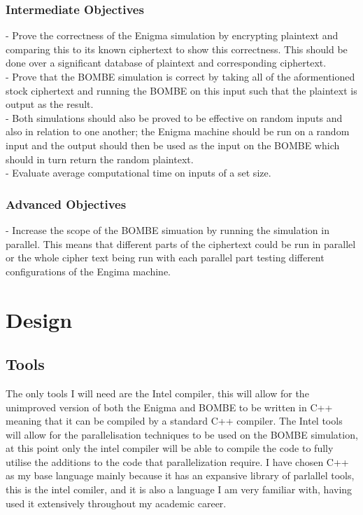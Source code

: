 \documentclass[12pt,a4paper]{article}
\begin{document}
\subsubsection{Intermediate Objectives}

- Prove the correctness of the Enigma simulation by encrypting plaintext and comparing this to its known ciphertext to show this correctness. This should be done over a significant database of plaintext and corresponding  ciphertext.\\
- Prove that the BOMBE simulation is correct by taking all of the aformentioned stock ciphertext and running the BOMBE on this input such that the plaintext is output as the result.\\
- Both simulations should also be proved to be effective on random inputs and also in relation to one another; the Enigma machine should be run on a random input and the output should then be used as the input on the BOMBE which should in turn return the random plaintext.\\
- Evaluate average computational time on inputs of a set size.

\subsubsection{Advanced Objectives}

- Increase the scope of the BOMBE simuation by running the simulation in parallel. This means that different parts of the ciphertext could be run in parallel or the whole cipher text being run with each parallel part testing different configurations of the Engima machine.



\section{Design}

\subsection{Tools}

The only tools I will need are the Intel compiler, this will allow for the unimproved version of both the Enigma and BOMBE to be written in C++ meaning that it can be compiled by a standard C++ compiler. The Intel tools will allow for the parallelisation techniques to be used on the BOMBE simulation, at this point only the intel compiler will be able to compile the code to fully utilise the additions to the code that parallelization require. I have chosen C++ as my base language mainly because it has an expansive library of parlallel tools, this is the intel comiler, and it is also a language I am very familiar with, having used it extensively throughout my academic career.
\end{document}
